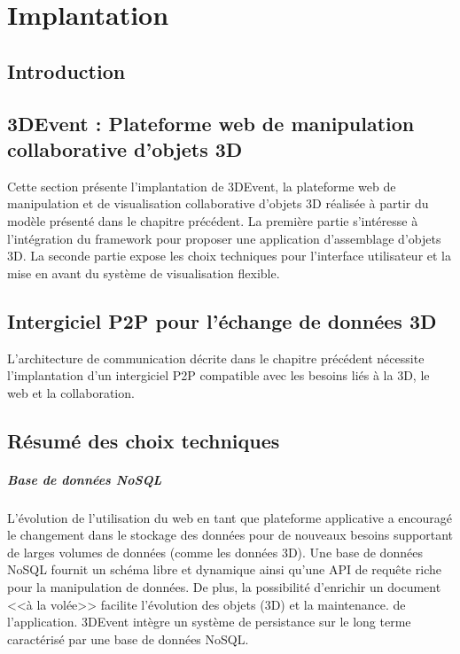 
\chapter{Implantation}
\chaptertable

\section{Introduction} 


\section{3DEvent : Plateforme web de manipulation collaborative d'objets 3D}
Cette section présente l'implantation de 3DEvent, la plateforme web de 
manipulation et de visualisation collaborative d'objets 3D réalisée à partir du modèle 
présenté dans le chapitre précédent. La première partie s'intéresse à l'intégration 
du framework pour proposer une application d'assemblage d'objets 3D. La seconde 
partie expose les choix techniques pour l'interface utilisateur et la mise en avant 
du système de visualisation flexible.



\section{Intergiciel P2P pour l'échange de données 3D}

L'architecture de communication décrite dans le chapitre précédent nécessite 
l'implantation d'un intergiciel P2P compatible avec les besoins liés à la 3D, le 
web et la collaboration. 




\section{Résumé des choix techniques}

\paragraph{Base de données NoSQL}\label{p:nosql} L'évolution de 
l'utilisation du web en tant que plateforme applicative a encouragé le changement 
dans le stockage des données pour de nouveaux besoins supportant de larges 
volumes de données (comme les données 3D). Une base de données \gls{NoSQL} 
fournit un schéma libre et dynamique ainsi qu'une API de requête riche pour la 
manipulation de données. De plus, la possibilité d'enrichir un document <<à la volée>> 
facilite l'évolution des objets (3D) et la maintenance. de l'application.
3DEvent intègre un système de persistance sur le long terme caractérisé par une 
base de données \gls{NoSQL}.

